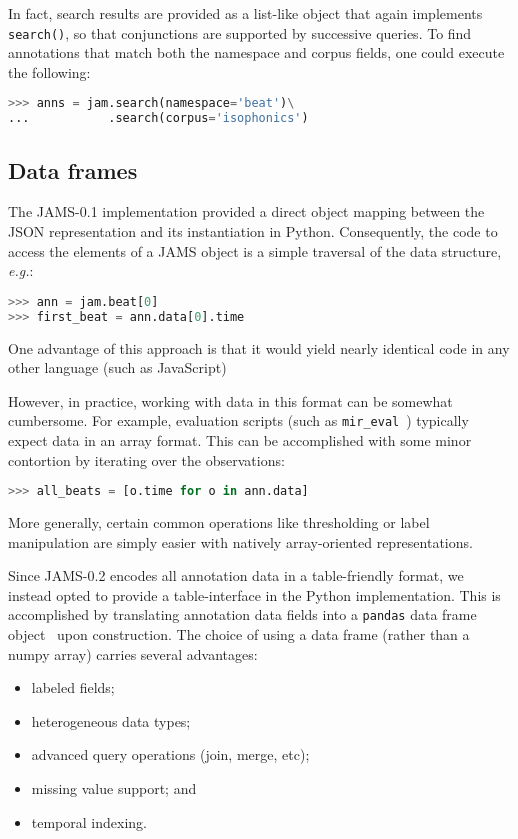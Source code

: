 \documentclass{article}
\begin{document}
In fact, search results are provided as a list-like object that again implements 
\texttt{search()}, so that conjunctions are supported by successive queries.
To find annotations that match both the namespace and corpus fields, one could execute 
the following:
\begin{lstlisting}[language=python]
>>> anns = jam.search(namespace='beat')\
...           .search(corpus='isophonics')
\end{lstlisting}


\subsection{Data frames}\label{sec:imp:dataframe}
The JAMS-0.1 implementation provided a direct object mapping between the JSON representation
and its instantiation in Python.
Consequently, the code to access the elements of a JAMS object is a simple traversal of the
data structure, \emph{e.g.}:
\begin{lstlisting}[language=python]
>>> ann = jam.beat[0]
>>> first_beat = ann.data[0].time
\end{lstlisting}
One advantage of this approach is that it would yield nearly identical code in any other
language (such as JavaScript)

However, in practice, working with data in this format can be somewhat cumbersome.
For example, evaluation scripts (such as \texttt{mir\_eval}~\cite{raffel2014}) typically expect
data in an array format.  This can be accomplished with some minor contortion by
iterating over the observations:
\begin{lstlisting}[language=python]
>>> all_beats = [o.time for o in ann.data]
\end{lstlisting}
More generally, certain common operations like thresholding or
label manipulation are simply easier with natively array-oriented representations.

Since JAMS-0.2 encodes all annotation data in a table-friendly format, we instead opted to
provide a table-interface in the Python implementation.  This is accomplished by
translating annotation data fields into a \texttt{pandas} data frame
object~\cite{mckinney-proc-scipy-2010} upon construction.
The choice of using a data frame (rather than a numpy array) carries several advantages:
\begin{itemize}
    \setlength\itemsep{0em}
    \item labeled fields;
    \item heterogeneous data types;
    \item advanced query operations (join, merge, etc);
    \item missing value support; and
    \item temporal indexing.
\end{itemize}
\end{document}
